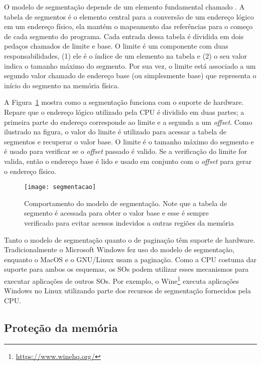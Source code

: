 O modelo de segmentação depende de um elemento fundamental chamado
. A tabela de segmentos é o elemento central
para a conversão de um endereço lógico em um endereço físico, ela mantém o
mapeamento das referências para o começo de cada segmento do programa. Cada
entrada dessa tabela é dividida em dois pedaços chamados de limite e base. O
limite é um componente com duas responsabilidades, (1) ele é o índice de um
elemento na tabela e (2) o seu valor indica o tamanho máximo do segmento. Por
sua vez, o limite está associado a um segundo valor chamado de endereço base
(ou simplesmente base) que representa o início do segmento na memória física.

A Figura~\ref{fig:segmentacao} mostra como a segmentação funciona com o suporte
de hardware. Repare que o endereço lógico utilizado pela CPU é dividido em duas
partes; a primeira parte do endereço corresponde ao limite e a segunda a um
\emph{offset}. Como ilustrado na figura, o valor do limite é utilizado para
acessar a tabela de segmentos e recuperar o valor base. O limite é o tamanho
máximo do segmento e é usado para verificar se o \emph{offset} passado é
valido. Se a verificação do limite for valida, então o endereço base é lido e
usado em conjunto com o \emph{offset} para gerar o endereço físico.

\begin{figure}[!h]
  \centering
  \texttt{[image: segmentacao]} 
  \caption{Comportamento do modelo de segmentação. Note que a tabela de segmento é acessada para obter o valor base e esse é sempre verificado para evitar acessos indevidos a outras regiões da memória}
  \label{fig:segmentacao} 
\end{figure}

Tanto o modelo de segmentação quanto o de paginação têm suporte de hardware.
Tradicionalmente o Microsoft Windows fez uso do modelo de segmentação, enquanto
o MacOS e o GNU/Linux usam a paginação. Como a CPU costuma dar suporte para
ambos os esquemas, os SOs podem utilizar esses mecanismos para executar
aplicações de outros SOs. Por exemplo, o
Wine\footnote{\url{https://www.winehq.org/}} executa aplicações Windows no
Linux utilizando parte dos recursos de segmentação fornecidos pela CPU.

\subsection{Proteção da memória}
\label{sec:outros_mecanismos_memoria}

